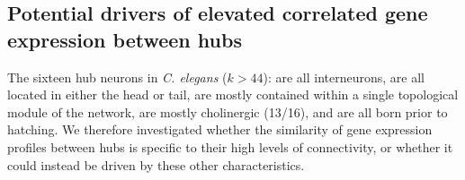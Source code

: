 \documentclass[10pt,letterpaper]{article}
\begin{document}
\subsection*{Potential drivers of elevated correlated gene expression between hubs}
The sixteen hub neurons in \emph{C. elegans} ($k > 44$):
are all interneurons,
are all located in either the head or tail,
are mostly contained within a single topological module of the network,
are mostly cholinergic (13/16),
and are all born prior to hatching.
We therefore investigated whether the similarity of gene expression profiles between hubs is specific to their high levels of connectivity, or whether it could instead be driven by these other characteristics.


\end{document}
